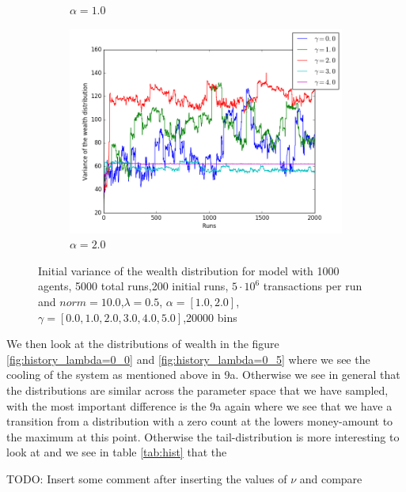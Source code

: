\documentclass[a4paper,11pt]{article}
\begin{document}
{\begin{figure}[H]
\begin{subfigure}[t]{0.45\textwidth}
		\caption{$\alpha=1.0$ }
		\label{fig:historic_lambda=0_0_alpha=1init}
	\end{subfigure}
	\begin{subfigure}[t]{0.45\textwidth}
		\includegraphics[scale=0.4]{historic_lambda=0_0_alpha=2initnr1}
		\caption{$\alpha=2.0$}
		\label{fig:historic_lambda=0_0_alpha=2init}
	\end{subfigure}
	\caption{Initial variance of the wealth distribution for model with 1000 agents, 5000 total runs,200 initial runs,  $5\cdot 10^{6}$ transactions per run and  $norm=10.0$,$\lambda=0.5$, $\alpha=[1.0,2.0]$, $\gamma=[0.0,1.0,2.0,3.0,4.0,5.0]$,20000 bins}
	\label{fig:equi}
\end{figure}

We then look at the distributions of wealth in the figure \ref{fig:history_lambda=0_0} and \ref{fig:history_lambda=0_5} where we see the cooling of the system as mentioned above in 9a. Otherwise we see in general that the distributions are similar across the parameter space that we have sampled, with the most important difference is the 9a again where we see that we have a transition from a distribution with a zero count at the lowers money-amount to the maximum at this point. Otherwise the tail-distribution is more interesting to look at and we see in table \ref{tab:hist} that the 

TODO: Insert some comment after inserting the values of $\nu$ and compare


}
\end{document}
